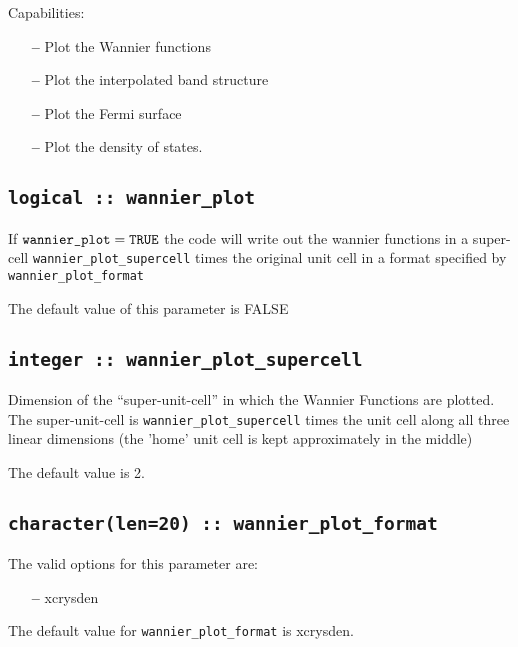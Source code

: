  Capabilities:

\begin{itemize}
\item[{\bf --}]  Plot the Wannier functions
\item[{\bf --}]  Plot the interpolated band structure 		     
\item[{\bf --}]  Plot the Fermi surface 			     
\item[{\bf --}]  Plot the density of states.
\end{itemize}


\subsection[wannier\_plot]{\tt logical :: wannier\_plot}

If $\verb#wannier_plot#=\verb#TRUE#$ the code will write out the
wannier functions in a super-cell \verb#wannier_plot_supercell# times
the original unit cell in a format specified by \verb#wannier_plot_format#

The default value of this parameter is FALSE

\subsection[wannier\_plot\_supercell]{\tt integer :: wannier\_plot\_supercell}

Dimension of the ``super-unit-cell'' in which the Wannier Functions are plotted.
The super-unit-cell is \verb#wannier_plot_supercell# times the unit cell along all three
linear dimensions (the 'home' unit cell is kept approximately
in the middle)

The default value is 2.

\subsection[wannier\_plot\_format]{\tt character(len=20) :: wannier\_plot\_format}

The valid options for this parameter are:
\begin{itemize}
\item[{\bf --}] xcrysden
\end{itemize}

The default value for \verb#wannier_plot_format# is xcrysden.



